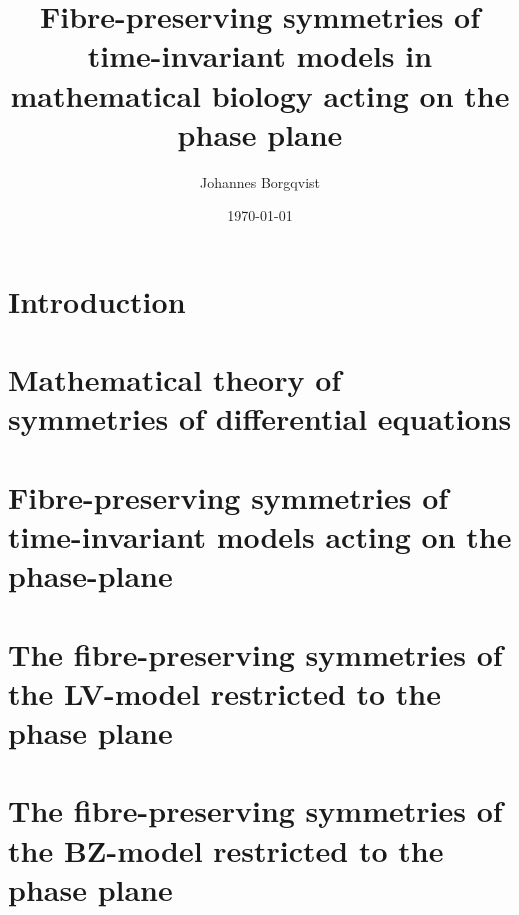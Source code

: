 \documentclass[12pt]{article}
\theoremstyle{definition}
\theoremstyle{remark}
\begin{document}
\title{\textbf{Fibre-preserving symmetries of time-invariant models in mathematical biology acting on the phase plane}}
\author{Johannes Borgqvist}
\date{\today}
\maketitle
\tableofcontents
\clearpage
\section{Introduction}

\section{Mathematical theory of symmetries of differential equations}

\section{Fibre-preserving symmetries of time-invariant models acting on the phase-plane}

\section{The fibre-preserving symmetries of the LV-model restricted to the phase plane}

\section{The fibre-preserving symmetries of the BZ-model restricted to the phase plane}

% 
\end{document}

